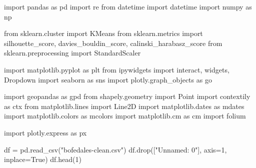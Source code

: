 \documentclass[
  letterpaper,
  DIV=11,
  numbers=noendperiod]{scrreprt}
\newenvironment{Shaded}{\begin{snugshade}}{\end{snugshade}}
\newcommand{\DecValTok}[1]{\textcolor[rgb]{0.68,0.00,0.00}{#1}}
\newcommand{\ImportTok}[1]{\textcolor[rgb]{0.00,0.46,0.62}{#1}}
\newcommand{\NormalTok}[1]{\textcolor[rgb]{0.00,0.23,0.31}{#1}}
\newcommand{\OperatorTok}[1]{\textcolor[rgb]{0.37,0.37,0.37}{#1}}
\newcommand{\StringTok}[1]{\textcolor[rgb]{0.13,0.47,0.30}{#1}}
\newcommand{\VariableTok}[1]{\textcolor[rgb]{0.07,0.07,0.07}{#1}}
\begin{document}
\begin{Shaded}
\begin{Highlighting}[]
\ImportTok{import}\NormalTok{ pandas }\ImportTok{as}\NormalTok{ pd}
\ImportTok{import}\NormalTok{ re}
\ImportTok{from}\NormalTok{ datetime }\ImportTok{import}\NormalTok{ datetime}
\ImportTok{import}\NormalTok{ numpy }\ImportTok{as}\NormalTok{ np}

\ImportTok{from}\NormalTok{ sklearn.cluster }\ImportTok{import}\NormalTok{ KMeans}
\ImportTok{from}\NormalTok{ sklearn.metrics }\ImportTok{import}\NormalTok{ silhouette\_score, davies\_bouldin\_score, calinski\_harabasz\_score}
\ImportTok{from}\NormalTok{ sklearn.preprocessing }\ImportTok{import}\NormalTok{ StandardScaler}

\ImportTok{import}\NormalTok{ matplotlib.pyplot }\ImportTok{as}\NormalTok{ plt}
\ImportTok{from}\NormalTok{ ipywidgets }\ImportTok{import}\NormalTok{ interact, widgets, Dropdown}
\ImportTok{import}\NormalTok{ seaborn }\ImportTok{as}\NormalTok{ sns}
\ImportTok{import}\NormalTok{ plotly.graph\_objects }\ImportTok{as}\NormalTok{ go}

\ImportTok{import}\NormalTok{ geopandas }\ImportTok{as}\NormalTok{ gpd}
\ImportTok{from}\NormalTok{ shapely.geometry }\ImportTok{import}\NormalTok{ Point}
\ImportTok{import}\NormalTok{ contextily }\ImportTok{as}\NormalTok{ ctx}
\ImportTok{from}\NormalTok{ matplotlib.lines }\ImportTok{import}\NormalTok{ Line2D}
\ImportTok{import}\NormalTok{ matplotlib.dates }\ImportTok{as}\NormalTok{ mdates}
\ImportTok{import}\NormalTok{ matplotlib.colors }\ImportTok{as}\NormalTok{ mcolors}
\ImportTok{import}\NormalTok{ matplotlib.cm }\ImportTok{as}\NormalTok{ cm}
\ImportTok{import}\NormalTok{ folium}

\ImportTok{import}\NormalTok{ plotly.express }\ImportTok{as}\NormalTok{ px}
\end{Highlighting}
\end{Shaded}

\begin{Shaded}
\begin{Highlighting}[]
\NormalTok{df }\OperatorTok{=}\NormalTok{ pd.read\_csv(}\StringTok{"bofedales{-}clean.csv"}\NormalTok{)}
\NormalTok{df.drop([}\StringTok{"Unnamed: 0"}\NormalTok{], axis}\OperatorTok{=}\DecValTok{1}\NormalTok{, inplace}\OperatorTok{=}\VariableTok{True}\NormalTok{)}
\NormalTok{df.head(}\DecValTok{1}\NormalTok{)}
\end{Highlighting}
\end{Shaded}
\end{document}
